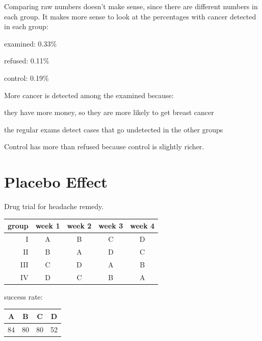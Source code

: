 \documentclass[landscape]{exam}
\begin{document}
\begin{itemize*}
      \begin{solution}
        Comparing raw numbers doesn't make sense, since there are different
        numbers in each group.  It makes more sense to look at the percentages
        with cancer detected in each group:
        \begin{itemize*}
          \item examined: 0.33\%
          \item refused: 0.11\%
          \item control: 0.19\%
        \end{itemize*}

        More cancer is detected among the examined because:
        \begin{itemize*}
          \item they have more money, so they are more likely to get breast
            cancer
          \item the regular exams detect cases that go undetected in the other
            groups
        \end{itemize*}

        Control has more than refused because control is slightly richer.
      \end{solution}

  \end{itemize*}

  \section{Placebo Effect}

  Drug trial for headache remedy.

  \begin{tabular}[H]{rcccc}
    \toprule
    group & week 1 & week 2 & week 3 & week 4 \\
    \midrule
    I     & A      & B      & C      & D \\
    II    & B      & A      & D      & C \\
    III   & C      & D      & A      & B \\
    IV    & D      & C      & B      & A \\
  \end{tabular}

  success rate:
  \begin{tabular}[H]{cccc}
    \toprule
    A  & B  & C  & D \\
    \midrule
    84 & 80 & 80 & 52 \\
    \bottomrule
  \end{tabular}
\end{document}
